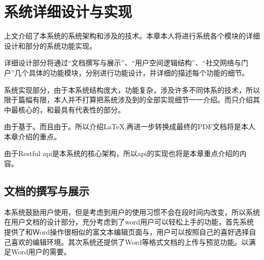 
\chapter{系统详细设计与实现}
\label{chap:achieve}

上文介绍了本系统的系统架构和涉及的技术。本章本人将进行系统各个模块的详细设计和部分的系统功能实现。

详细设计部分将通过“文档撰写与展示”、“用户空间逻辑结构”、“社交网络与门户”几个具体的功能模块，分别进行功能设计，并详细的描述每个功能的细节。

系统实现部分，由于本系统结构庞大，功能复杂，涉及许多不同体系的技术，所以限于篇幅有限，本人并不打算把系统涉及到的全部实现细节一一介绍。而只介绍其中最核心的，和最具有代表性的部分。

由于基于。而且由于。所以介绍\LaTeX,再进一步转换成最终的PDF文档将是本人本章介绍的重点。

由于Restful api\cite{richardson2008restful,allamaraju2010restful,fielding2000architectural,pautasso2008restful,story2009foaf}是本系统的核心架构，所以api的实现也将是本章重点介绍的内容。

\section{文档的撰写与展示}
\label{sec:writeandview}

本系统鼓励用户使用，但是考虑到用户的使用习惯不会在段时间内改变，所以系统在用户文档的设计部分，充分考虑到了word用户可以轻松上手的功能，首先系统提供了和Ｗord操作很相似的富文本编辑页面与，用户可以按照自己的喜好选择自己喜欢的编辑环境。其次系统还提供了Word等格式文档的上传与预览功能。以满足Word用户的需要。


